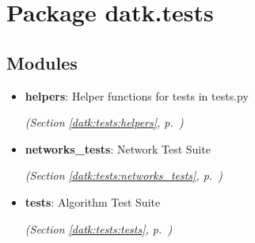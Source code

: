 %
%
%


\section{Package datk.tests}

    \label{datk:tests}


\subsection{Modules}

\begin{itemize}
\setlength{\parskip}{0ex}
\item \textbf{helpers}: Helper functions for tests in tests.py



  \textit{(Section \ref{datk:tests:helpers}, p.~\pageref{datk:tests:helpers})}

\item \textbf{networks\_tests}: Network Test Suite



  \textit{(Section \ref{datk:tests:networks_tests}, p.~\pageref{datk:tests:networks_tests})}

\item \textbf{tests}: Algorithm Test Suite



  \textit{(Section \ref{datk:tests:tests}, p.~\pageref{datk:tests:tests})}

\end{itemize}



